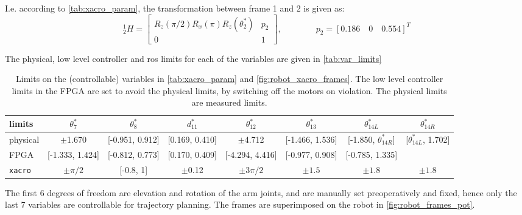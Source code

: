 I.e. according to \autoref{tab:xacro_param}, the transformation between frame 1 and 2 is given as:
\begin{equation}
^1_2H = 
\begin{bmatrix}
R_z(\pi/2)R_x(\pi)R_z(\theta_2^*) & p_2\\
0 & 1
\end{bmatrix}, \qquad\qquad
p_2 = [0.186 \quad 0 \quad 0.554]^T
\end{equation}

The physical, low level controller and \gls{ros} limits for each of the variables are given in \autoref{tab:var_limits}


\begin{table}[htbp]
\small%
\begin{tabular}{l | ccccccc}
limits & $\theta_7^*$ & $\theta_8^*$ & $d_{11}^*$ & $\theta_{12}^*$ & $\theta_{13}^*$ & $\theta_{14L}^*$ & $\theta_{14R}^*$ \\\hline
physical & $\pm$1.670 & [-0.951, 0.912] & [0.169, 0.410] & $\pm$4.712 & [-1.466, 1.536] & [-1.850, $\theta_{14R}^*$] & [$\theta_{14L}^*$, 1.702] \\
FPGA & [-1.333, 1.424] & [-0.812, 0.773] & [0.170, 0.409] & [-4.294, 4.416] & [-0.977, 0.908] & [-0.785, 1.335] & \\
\texttt{xacro} & $\pm\pi/2$ & [-0.8, 1] & $\pm$0.12 & $\pm3\pi/2$ & $\pm 1.5$ & $\pm 1.8$ & $\pm 1.8$
\end{tabular}
\normalsize
\caption{Limits on the (controllable) variables in \autoref{tab:xacro_param} and \autoref{fig:robot_xacro_frames}. The low level controller limits in the FPGA are set to avoid the physical limits, by switching off the motors on violation. The physical limits are measured limits.}
\label{tab:var_limits}
\end{table}

The first 6 degrees of freedom are elevation and rotation of the arm joints, and are manually set preoperatively and fixed, hence only the last 7 variables are controllable for trajectory planning. 
The frames are superimposed on the robot in \autoref{fig:robot_frames_pot}.

